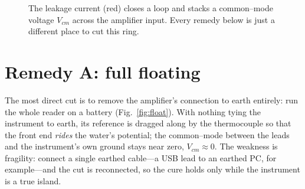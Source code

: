 \documentclass[11pt]{article}
\begin{document}
\begin{figure}[H]
\centering
{}
\caption{The leakage current (red) closes a loop and stacks a common--mode
voltage $V_{cm}$ across the amplifier input. Every remedy below is just a
different place to cut this ring.}
\label{fig:loop}
\end{figure}

\section{Remedy A: full floating}
The most direct cut is to remove the amplifier's connection to earth entirely:
run the whole reader on a battery (Fig.~\ref{fig:float}). With nothing tying
the instrument to earth, its reference is dragged along by the thermocouple so
that the front end \emph{rides} the water's potential; the common--mode
between the leads and the instrument's own ground stays near zero,
$V_{cm}\approx 0$. The weakness is fragility: connect a single earthed
cable---a USB lead to an earthed PC, for example---and the cut is reconnected,
so the cure holds only while the instrument is a true island.
\end{document}
